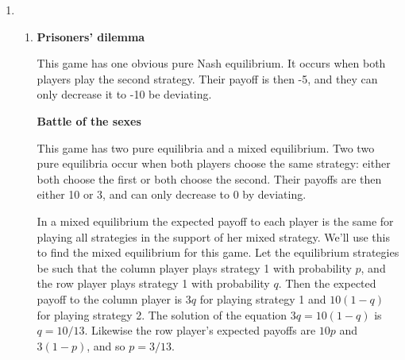 \documentclass[11pt]{article} \usepackage{amssymb}
\begin{document}
\begin{enumerate}
\begin{enumerate}
      A pure Nash equilibrium is a pair of pure (i.e., not mixed)
      strategies $(s_1,s_2)$ such that player 1 cannot get a better
      payoff by deviating from $s_1$, assuming the player 2 plays
      $s_2$, and vice versa.

      A mixed Nash equilibrium is a pair of mixed strategies for which
      the same holds. Such an equilibrium is guaranteed to exist in
      games where the sets of strategies are finite.

      A correlated equilibrium is a joint distribution $\mathcal{C}$
      over $S_1 \times S_2$. Such that if $(s_1,s_2)$ are drawn from
      $\mathcal{C}$ then...
  \item
    \begin{enumerate}
    \item {\bf Prisoners' dilemma}

      This game has one obvious pure Nash equilibrium. It occurs when
      both players play the second strategy. Their payoff is then -5,
      and they can only decrease it to -10 be deviating.

      \vspace{0.1in}
      {\bf Battle of the sexes}

      This game has two pure equilibria and a mixed equilibrium. Two
      two pure equilibria occur when both players choose the same
      strategy: either both choose the first or both choose the
      second. Their payoffs are then either 10 or 3, and can only
      decrease to 0 by deviating.

      In a mixed equilibrium the expected payoff to each player is the
      same for playing all strategies in the support of her mixed
      strategy. We'll use this to find the mixed equilibrium for this
      game. Let the equilibrium strategies be such that the column
      player plays strategy 1 with probability $p$, and the row
      player plays strategy 1 with probability $q$. Then the expected
      payoff to the column player is $3q$ for playing strategy 1 and
      $10(1-q)$ for playing strategy 2. The solution of the equation
      $3q=10(1-q)$ is $q=10/13$. Likewise the row player's expected
      payoffs are $10p$ and $3(1-p)$, and so $p=3/13$.
    \end{enumerate}
  \end{enumerate}
\end{enumerate}
\end{document}
